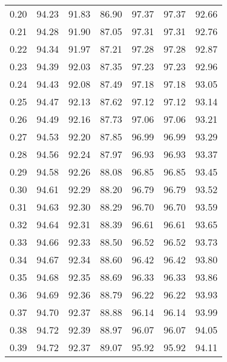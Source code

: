 \begin{tabular}{|c|c|c|c|c|c|c|}
      0.20 &     94.23 &     91.83 &      86.90 &   97.37 &      97.37 &         92.66 \\
      0.21 &     94.28 &     91.90 &      87.05 &   97.31 &      97.31 &         92.76 \\
      0.22 &     94.34 &     91.97 &      87.21 &   97.28 &      97.28 &         92.87 \\
      0.23 &     94.39 &     92.03 &      87.35 &   97.23 &      97.23 &         92.96 \\
      0.24 &     94.43 &     92.08 &      87.49 &   97.18 &      97.18 &         93.05 \\
      0.25 &     94.47 &     92.13 &      87.62 &   97.12 &      97.12 &         93.14 \\
      0.26 &     94.49 &     92.16 &      87.73 &   97.06 &      97.06 &         93.21 \\
      0.27 &     94.53 &     92.20 &      87.85 &   96.99 &      96.99 &         93.29 \\
      0.28 &     94.56 &     92.24 &      87.97 &   96.93 &      96.93 &         93.37 \\
      0.29 &     94.58 &     92.26 &      88.08 &   96.85 &      96.85 &         93.45 \\
      0.30 &     94.61 &     92.29 &      88.20 &   96.79 &      96.79 &         93.52 \\
      0.31 &     94.63 &     92.30 &      88.29 &   96.70 &      96.70 &         93.59 \\
      0.32 &     94.64 &     92.31 &      88.39 &   96.61 &      96.61 &         93.65 \\
      0.33 &     94.66 &     92.33 &      88.50 &   96.52 &      96.52 &         93.73 \\
      0.34 &     94.67 &     92.34 &      88.60 &   96.42 &      96.42 &         93.80 \\
      0.35 &     94.68 &     92.35 &      88.69 &   96.33 &      96.33 &         93.86 \\
      0.36 &     94.69 &     92.36 &      88.79 &   96.22 &      96.22 &         93.93 \\
      0.37 &     94.70 &     92.37 &      88.88 &   96.14 &      96.14 &         93.99 \\
      0.38 &     94.72 &     92.39 &      88.97 &   96.07 &      96.07 &         94.05 \\
      0.39 &     94.72 &     92.37 &      89.07 &   95.92 &      95.92 &         94.11 \\

\end{tabular}
